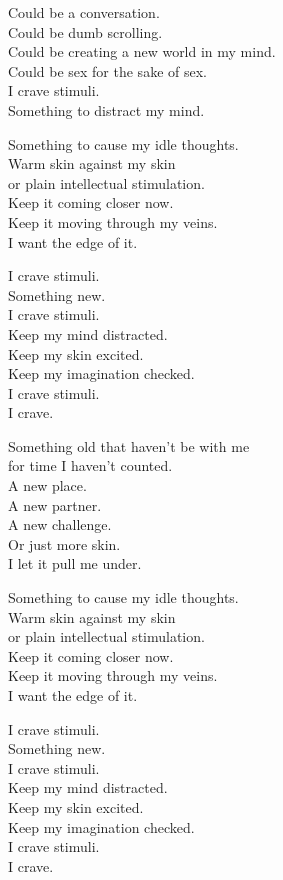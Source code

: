 \begin{lyrics}
Could be a conversation.\\
Could be dumb scrolling.\\
Could be creating a new world in my mind.\\
Could be sex for the sake of sex.\\
I crave stimuli.\\
Something to distract my mind.

Something to cause my idle thoughts.\\
Warm skin against my skin\\
or plain intellectual stimulation.\\
Keep it coming closer now.\\
Keep it moving through my veins.\\
I want the edge of it.

I crave stimuli.\\
Something new.\\
I crave stimuli.\\
Keep my mind distracted.\\
Keep my skin excited.\\
Keep my imagination checked.\\
I crave stimuli.\\
I crave.

Something old that haven't be with me\\
for time I haven't counted.\\
A new place.\\
A new partner.\\
A new challenge.\\
Or just more skin.\\
I let it pull me under.

Something to cause my idle thoughts.\\
Warm skin against my skin\\
or plain intellectual stimulation.\\
Keep it coming closer now.\\
Keep it moving through my veins.\\
I want the edge of it.

I crave stimuli.\\
Something new.\\
I crave stimuli.\\
Keep my mind distracted.\\
Keep my skin excited.\\
Keep my imagination checked.\\
I crave stimuli.\\
I crave.


\end{lyrics}
